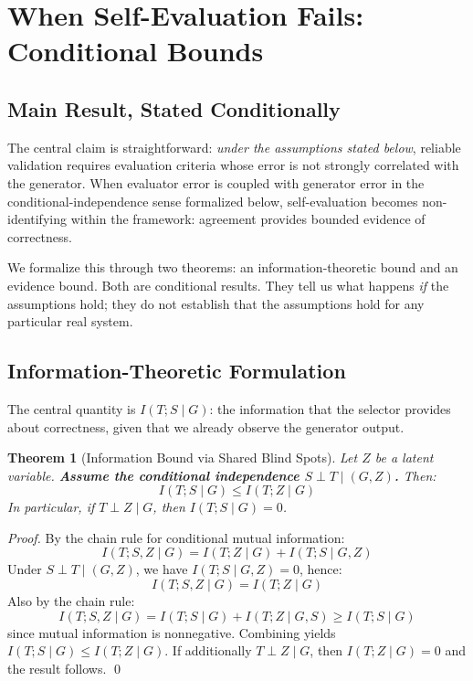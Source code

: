 \documentclass[11pt]{article}
\newtheorem{theorem}{Theorem}[section]
\begin{document}
\section{When Self-Evaluation Fails: Conditional Bounds}
\label{sec:when}

\subsection{Main Result, Stated Conditionally}

The central claim is straightforward: \emph{under the assumptions stated below}, reliable validation requires evaluation criteria whose error is not strongly correlated with the generator. When evaluator error is coupled with generator error in the conditional-independence sense formalized below, self-evaluation becomes non-identifying within the framework: agreement provides bounded evidence of correctness.

We formalize this through two theorems: an information-theoretic bound and an evidence bound. Both are conditional results. They tell us what happens \emph{if} the assumptions hold; they do not establish that the assumptions hold for any particular real system.

\subsection{Information-Theoretic Formulation}

The central quantity is $I(T; S \mid G)$: the information that the selector provides about correctness, given that we already observe the generator output.

\begin{theorem}[Information Bound via Shared Blind Spots]
\label{thm:info_bound}
Let $Z$ be a latent variable. \textbf{Assume the conditional independence $S \perp T \mid (G, Z)$.} Then:
\begin{equation}
I(T; S \mid G) \leq I(T; Z \mid G)
\end{equation}
In particular, if $T \perp Z \mid G$, then $I(T; S \mid G) = 0$.
\end{theorem}

\begin{proof}
By the chain rule for conditional mutual information:
\begin{equation}
I(T; S, Z \mid G) = I(T; Z \mid G) + I(T; S \mid G, Z)
\end{equation}
Under $S \perp T \mid (G, Z)$, we have $I(T; S \mid G, Z) = 0$, hence:
\begin{equation}
I(T; S, Z \mid G) = I(T; Z \mid G)
\end{equation}
Also by the chain rule:
\begin{equation}
I(T; S, Z \mid G) = I(T; S \mid G) + I(T; Z \mid G, S) \geq I(T; S \mid G)
\end{equation}
since mutual information is nonnegative. Combining yields $I(T; S \mid G) \leq I(T; Z \mid G)$. If additionally $T \perp Z \mid G$, then $I(T; Z \mid G) = 0$ and the result follows. \qed
\end{proof}
\end{document}

